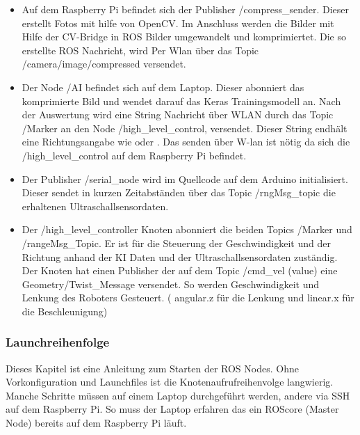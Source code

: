 \documentclass[conference]{IEEEtran}
\begin{document}
	\begin{itemize}
		\item Auf dem Raspberry Pi befindet sich der Publisher 
		/compress\_sender. Dieser erstellt Fotos mit hilfe von OpenCV. Im 
		Anschluss werden die Bilder mit Hilfe der CV-Bridge in ROS Bilder 
		umgewandelt und komprimiertet. Die so erstellte ROS Nachricht, wird 
		Per Wlan über das Topic /camera/image/compressed versendet.
		
		\item Der Node /AI befindet sich auf dem Laptop. Dieser abonniert das 
		komprimierte Bild und wendet darauf das Keras Trainingsmodell an. 
		Nach der Auswertung wird eine String Nachricht über WLAN durch 
		das  Topic /Marker an den Node /high\_level\_control,  versendet. 
		Dieser String endhält eine Richtungsangabe wie  oder 
		. Das senden über W-lan ist nötig da sich die  
		/high\_level\_control auf dem Raspberry Pi befindet.
		
		\item Der Publisher /serial\_node wird im Quellcode auf dem Arduino initialisiert. Dieser sendet in kurzen Zeitabständen über das Topic /rngMsg\_topic die erhaltenen Ultraschallsensordaten.
		
		\item Der /high\_level\_controller Knoten abonniert die beiden Topics 
		/Marker und /rangeMsg\_Topic. Er ist für die Steuerung der 
		Geschwindigkeit und der Richtung anhand der KI Daten und der 
		Ultraschallsensordaten zuständig. Der Knoten hat einen Publisher der 
		auf dem  Topic /cmd\_vel (value) eine Geometry/Twist\_Message 
		versendet. So werden Geschwindigkeit und Lenkung des Roboters 
		Gesteuert. ( angular.z für die Lenkung und linear.x für die 
		Beschleunigung)
		
		
	\end{itemize}

	\subsubsection{Launchreihenfolge}%
	
	Dieses Kapitel ist eine Anleitung zum Starten der ROS Nodes. Ohne 
	Vorkonfiguration und Launchfiles ist 
	die Knotenaufrufreihenvolge langwierig. Manche Schritte müssen auf einem 
	Laptop durchgeführt werden, andere via SSH auf dem Raspberry Pi. So 
	muss der Laptop erfahren das ein ROScore (Master Node) bereits auf dem 
	Raspberry Pi läuft.
	
\end{document}
